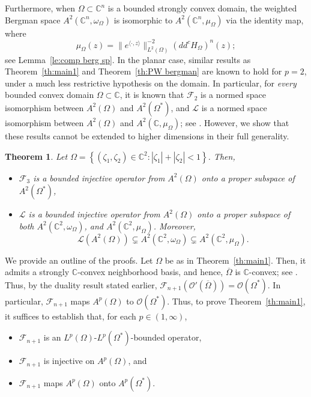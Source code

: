 \documentclass[11pt, oneside, reqno]{amsart}
\numberwithin{equation}{section}
\newtheorem{theorem}{Theorem}[section]
\theoremstyle{definition}
\newcommand{\hol}{\mathcal {O}}
\newcommand{\C}{\mathbb C}
\newcommand{\F}{\mathcal F}
\newcommand{\ltt}{\left(}
\newcommand{\rtt}{\right)}
\newcommand{\Om}{\Omega}
\begin{document}
{{
Furthermore, when $\Om\subset\C^n$ is a bounded strongly convex domain, the weighted Bergman space $A^2(\C^n,\omega_\Om)$ is isomorphic to $A^2(\C^n,\mu_\Om)$ via the identity map, where
\[
\mu_\Om(z)=\|e^{\langle\cdot,z\rangle}\|^{-2}_{L^2(\Om)} \ltt dd^cH_\Om\rtt^n(z);
\]
see Lemma~\ref{le:comp berg sp}.
In the planar case, similar results as Theorem~\ref{th:main1} and Theorem~\ref{th:PW bergman} are known to hold for $p=2$, under a much less restrictive hypothesis on the domain. In particular, for {\em every} bounded convex domain $\Om\subset\C$, it is known that $\mathcal F_2$ is a normed space isomorphism between $A^2(\Om)$ and $A^2(\Om^*)$, and $\mathcal L$ is a normed space isomorphism between $A^2(\Om)$ and $A^2(\C,\mu_\Om)$; see \cite{NY95,MK99,IY04}.  However, we show that these results cannot be extended to higher dimensions in their full generality. 
\begin{theorem}\label{th:counter}
Let 
$\Om=\left\{\ltt \zeta_1,\zeta_2\rtt\in\C^2: |\zeta_1|+|\zeta_2|<1\right\}$. Then, 
\begin{itemize}
    \item [$(i)$] $\mathcal F_3$ is a bounded injective operator from $A^2(\Om)$ onto a proper subspace of $A^2(\Om^*)$,
    \item [$(ii)$] $\mathcal L$ is a bounded injective operator from $A^2(\Om)$ onto a proper subspace of both $A^2(\C^2,\omega_{\Om})$, and $A^2(\C^2,\mu_\Om)$. Moreover,
    \[
    \mathcal L(A^2(\Om))\subsetneq A^2(\C^2,\omega_\Om)\subsetneq A^2(\C^2,\mu_\Om).
    \]
    \end{itemize}
\end{theorem}
}
We provide an outline of the proofs. Let $\Om$ be as in Theorem~\ref{th:main1}. Then, it admits a strongly $\C$-convex neighborhood basis, and hence, $\overline\Om$ is $\C$-convex; see {\cite[page 27]{APS}}. Thus, by the duality result stated earlier, $\F_{n+1}\ltt\hol'\ltt\overline\Om\rtt\rtt=\hol\ltt\Om^*\rtt$. In particular, $\F_{n+1}$ maps $A^p(\Om)$ to $\hol\ltt\Om^*\rtt$. Thus, to prove Theorem~\ref{th:main1}, it suffices to establish that, for each $p\in(1,\infty)$, 
\begin{itemize}
    \item [$1.$] $\mathcal F_{n+1}$ is an $L^p(\Om)$-$L^p(\Om^*)$-bounded operator,
    \item [$2.$] $\mathcal F_{n+1}$ is injective on $A^p(\Om)$, and
    \item [$3.$] $\mathcal F_{n+1}$ maps $A^p(\Om)$ onto $A^p(\Om^*)$.    
\end{itemize}
}
\end{document}
